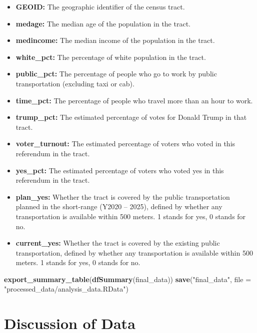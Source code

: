\documentclass[
]{article}
\newenvironment{Shaded}{\begin{snugshade}}{\end{snugshade}}
\newcommand{\DataTypeTok}[1]{\textcolor[rgb]{0.13,0.29,0.53}{#1}}
\newcommand{\KeywordTok}[1]{\textcolor[rgb]{0.13,0.29,0.53}{\textbf{#1}}}
\newcommand{\NormalTok}[1]{#1}
\newcommand{\StringTok}[1]{\textcolor[rgb]{0.31,0.60,0.02}{#1}}
\providecommand{\tightlist}{%
  \setlength{\itemsep}{0pt}\setlength{\parskip}{0pt}}
\begin{document}
\begin{itemize}
\tightlist
\item
  \textbf{GEOID:} The geographic identifier of the census tract.\\
\item
  \textbf{medage:} The median age of the population in the tract.
\item
  \textbf{medincome:} The median income of the population in the tract.
\item
  \textbf{white\_pct:} The percentage of white population in the tract.
\item
  \textbf{public\_pct:} The percentage of people who go to work by
  public transportation (excluding taxi or cab).\\
\item
  \textbf{time\_pct:} The percentage of people who travel more than an
  hour to work.\\
\item
  \textbf{trump\_pct:} The estimated percentage of votes for Donald
  Trump in that tract.
\item
  \textbf{voter\_turnout:} The estimated percentage of voters who voted
  in this referendum in the tract.
\item
  \textbf{yes\_pct:} The estimated percentage of voters who voted yes in
  this referendum in the tract.
\item
  \textbf{plan\_yes:} Whether the tract is covered by the public
  transportation planned in the short-range (Y2020 -- 2025), defined by
  whether any transportation is available within 500 meters. 1 stands
  for yes, 0 stands for no.\\
\item
  \textbf{current\_yes:} Whether the tract is covered by the existing
  public transportation, defined by whether any transportation is
  available within 500 meters. 1 stands for yes, 0 stands for no.
\end{itemize}

\begin{Shaded}
\begin{Highlighting}[]
\KeywordTok{export_summary_table}\NormalTok{(}\KeywordTok{dfSummary}\NormalTok{(final_data))}
\KeywordTok{save}\NormalTok{(}\StringTok{"final_data"}\NormalTok{, }\DataTypeTok{file =} \StringTok{"processed_data/analysis_data.RData"}\NormalTok{)}
\end{Highlighting}
\end{Shaded}

\hypertarget{discussion-of-data}{%
\section{Discussion of Data}\label{discussion-of-data}}
\end{document}
